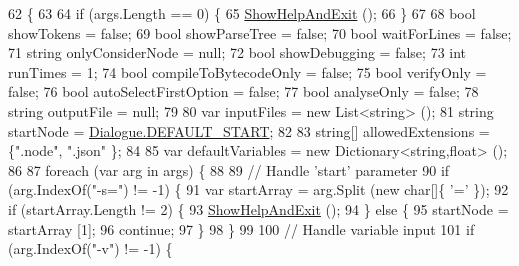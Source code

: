 \begin{DoxyCode}
62         \{
63 
64             \textcolor{keywordflow}{if} (args.Length == 0) \{
65                 \hyperlink{a00092_a0ce7698dabf6d60f3cd33fe5d23c11b3}{ShowHelpAndExit} ();
66             \}
67 
68             \textcolor{keywordtype}{bool} showTokens = \textcolor{keyword}{false};
69             \textcolor{keywordtype}{bool} showParseTree = \textcolor{keyword}{false};
70             \textcolor{keywordtype}{bool} waitForLines = \textcolor{keyword}{false};
71             \textcolor{keywordtype}{string} onlyConsiderNode = null;
72             \textcolor{keywordtype}{bool} showDebugging = \textcolor{keyword}{false};
73             \textcolor{keywordtype}{int} runTimes = 1;
74             \textcolor{keywordtype}{bool} compileToBytecodeOnly = \textcolor{keyword}{false};
75             \textcolor{keywordtype}{bool} verifyOnly = \textcolor{keyword}{false};
76             \textcolor{keywordtype}{bool} autoSelectFirstOption = \textcolor{keyword}{false};
77             \textcolor{keywordtype}{bool} analyseOnly = \textcolor{keyword}{false};
78             \textcolor{keywordtype}{string} outputFile = null;
79 
80             var inputFiles = \textcolor{keyword}{new} List<string> ();
81             \textcolor{keywordtype}{string} startNode = \hyperlink{a00036_a1b643f15f734090e6a58cbf13dafd28f}{Dialogue.DEFAULT\_START};
82 
83             \textcolor{keywordtype}{string}[] allowedExtensions = \{\textcolor{stringliteral}{".node"}, \textcolor{stringliteral}{".json"} \};
84 
85             var defaultVariables = \textcolor{keyword}{new} Dictionary<string,float> ();
86 
87             \textcolor{keywordflow}{foreach} (var arg \textcolor{keywordflow}{in} args) \{
88 
89                 \textcolor{comment}{// Handle 'start' parameter}
90                 \textcolor{keywordflow}{if} (arg.IndexOf(\textcolor{stringliteral}{"-s="}) != -1) \{
91                     var startArray = arg.Split (\textcolor{keyword}{new} \textcolor{keywordtype}{char}[]\{ \textcolor{charliteral}{'='} \});
92                     \textcolor{keywordflow}{if} (startArray.Length != 2) \{
93                         \hyperlink{a00092_a0ce7698dabf6d60f3cd33fe5d23c11b3}{ShowHelpAndExit} ();
94                     \} \textcolor{keywordflow}{else} \{
95                         startNode = startArray [1];
96                         \textcolor{keywordflow}{continue};
97                     \}
98                 \}
99 
100                 \textcolor{comment}{// Handle variable input}
101                 \textcolor{keywordflow}{if} (arg.IndexOf(\textcolor{stringliteral}{"-v"}) != -1) \{

\end{DoxyCode}
